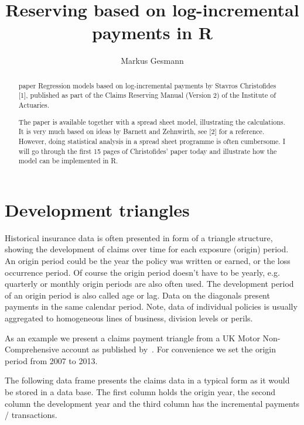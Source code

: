 \documentclass{article}
\begin{document}


\author{Markus Gesmann}

\title{Reserving based on log-incremental payments in R}
\maketitle
\begin{abstract}

 paper Regression models based on log-incremental payments by Stavros Christofides [1], published as part of the Claims Reserving Manual (Version 2) of the Institute of Actuaries.

The paper is available together with a spread sheet model, illustrating the calculations. It is very much based on ideas by Barnett and Zehnwirth, see [2] for a reference. However, doing statistical analysis in a spread sheet programme is often cumbersome. I will go through the first 15 pages of Christofides' paper today and illustrate how the model can be implemented in R. 
  
\end{abstract}

\clearpage
\tableofcontents
\clearpage



\section{Development triangles}\label{sec:triangles}

Historical insurance data is often presented in form of a triangle
structure, showing the development of claims over time for each
exposure (origin) period. An origin period could be the year the
policy was written or earned, or the loss occurrence period. Of course the
origin period doesn't have to be yearly, e.g. 
quarterly or monthly origin periods are also often used. 
The development period of an origin period is also called age or lag.
Data on the diagonals present payments in the same calendar period.
Note, data of individual policies is usually aggregated to homogeneous 
lines of business, division levels or perils.

As an example we present a claims payment triangle from a UK Motor
Non-Comprehensive account as published by~\cite{Christofides1997}. For
convenience we set the origin period from 2007 to 2013.

The following data frame presents the claims data in a typical form as
it would be stored in a data base. The first column holds the origin
year, the second column the development year and the third
column has the incremental payments / transactions.
\end{document}
